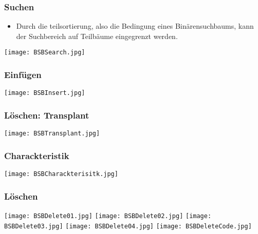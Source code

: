 		\begin{minipage}[t]{0.45\textwidth}
			\subsubsection{Suchen}
				\begin{itemize}
					\item Durch die teilsortierung, also die Bedingung eines Binärensuchbaums, 
						kann der Suchbereich auf Teilbäume eingegrenzt werden.
				\end{itemize}
				\begin{center}
					\texttt{[image: BSBSearch.jpg]}
				\end{center}
		\end{minipage}
		\begin{minipage}[t]{0.1\textwidth}
			\hspace{0.5cm}
		\end{minipage}
		\begin{minipage}[t]{0.45\textwidth}
			\subsubsection{Einfügen}
				\texttt{[image: BSBInsert.jpg]}
		\end{minipage}

		\vspace{1.5cm}

		\begin{minipage}[t]{0.35\textwidth}
			\subsubsection{Löschen: Transplant}
				\texttt{[image: BSBTransplant.jpg]}

			\vspace{1cm}
			\subsubsection{Charackteristik}
				\texttt{[image: BSBCharackterisitk.jpg]}
		\end{minipage}
		\begin{minipage}[t]{0.1\textwidth}
			\hspace{0.5cm}
		\end{minipage}
		\begin{minipage}[t]{0.55\textwidth}
			\subsubsection{Löschen}
				\begin{center}
					\texttt{[image: BSBDelete01.jpg]}
					\texttt{[image: BSBDelete02.jpg]}
					\texttt{[image: BSBDelete03.jpg]}
					\texttt{[image: BSBDelete04.jpg]}
					\texttt{[image: BSBDeleteCode.jpg]}
				\end{center}
		\end{minipage}


